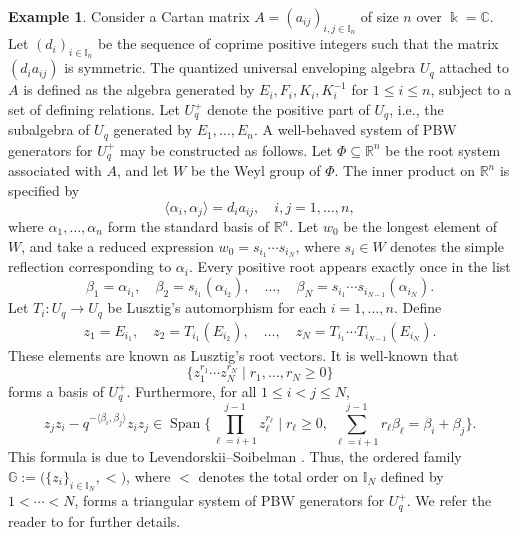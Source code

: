 \documentclass{article}
\theoremstyle{plain}
\theoremstyle{definition}
\newtheorem{example}[thm]{Example}
\numberwithin{equation}{section}
\DeclareMathOperator{\Span}{Span}
\newcommand{\GG}{\mathbb{G}}
\newcommand{\II}{\mathbb{I}}
\begin{document}
	\begin{example}
		Consider a Cartan matrix $A=(a_{ij})_{i,j\in \II_{n}}$ of size $n$ over $\Bbbk=\mathbb{C}$. Let $(d_{i})_{i\in \II_{n}}$ be the sequence of coprime positive integers such that the matrix $(d_{i}a_{ij})$ is symmetric. The quantized universal enveloping algebra $U_{q}$ attached to $A$ is defined as the algebra generated by $E_{i}, F_{i}, K_{i}, K_{i}^{-1}$ for $1\leq i\leq n$, subject to a set of defining relations. Let $U_{q}^{+}$ denote the positive part of $U_{q}$, i.e., the subalgebra of $U_{q}$ generated by $E_{1},\dots,E_{n}$. A well-behaved system of PBW generators for $U_{q}^{+}$ may be constructed as follows. Let $\Phi\subseteq \mathbb{R}^{n}$ be the root system associated with $A$, and let $W$ be the Weyl group of $\Phi$. The inner product on $\mathbb{R}^{n}$ is specified by
		\[\langle \alpha_{i}, \alpha_{j}\rangle = d_{i} a_{ij},\quad i,j=1,\dots, n,\]
		where $\alpha_{1},\dots,\alpha_{n}$ form the standard basis of $\mathbb{R}^{n}$. Let $w_{0}$ be the longest element of $W$, and take a reduced expression $w_{0}=s_{i_{1}}\cdots s_{i_{N}}$, where $s_{i}\in W$ denotes the simple reflection corresponding to $\alpha_{i}$. Every positive root appears exactly once in the list
		\[\beta_{1}=\alpha_{i_{1}},\quad \beta_{2} = s_{i_{1}}(\alpha_{i_{2}}),\quad \ldots,\quad \beta_{N} = s_{i_{1}}\cdots s_{i_{N-1}}(\alpha_{i_{N}}).\]
		Let $T_{i}\colon U_{q}\to U_{q}$ be Lusztig’s automorphism for each $i=1,\dots, n$. Define
		\begin{eqnarray*}
			z_{1} =E_{i_{1}},\quad z_{2} = T_{i_{1}}(E_{i_{2}}),\quad \ldots,\quad z_{N}= T_{i_{1}}\cdots T_{i_{N-1}}(E_{i_{N}}).
		\end{eqnarray*}
		These elements are known as Lusztig’s root vectors. It is well-known that \[\{z_{1}^{r_{1}}\cdots z_{N}^{r_{N}} \mid r_{1},\dots, r_{N}\geq 0\}\] forms a basis of $U_{q}^{+}$. Furthermore, for all $1\leq i<j\leq N$,
		\[z_{j}z_{i} - q^{-\langle \beta_{i}, \beta_{j} \rangle} z_{i}z_{j} \in \Span\biggl\{ \prod_{\ell=i+1}^{j-1} z_{\ell}^{r_{\ell}} \;\bigg|\; r_{\ell}\geq 0,\;\sum_{\ell=i+1}^{j-1} r_{\ell} \beta_{\ell} =\beta_{i}+\beta_{j}\biggr\}.\]
		This formula is due to Levendorskii–Soibelman \cite{LS91}. Thus, the ordered family $\GG:= \bigl(\{z_{i}\}_{i\in \II_{N}},<\bigr)$, where $<$ denotes the total order on $\II_{N}$ defined by $1< \cdots < N$, forms a triangular system of PBW generators for $U_{q}^{+}$. We refer the reader to \cite[Section 9]{DeP93} for further details.
	\end{example}
	
\end{document}
